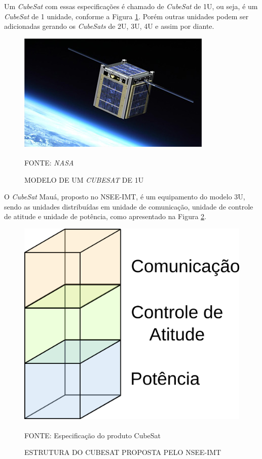 \documentclass[
	12pt,				%
	openright,			%
	oneside,			%
	a4paper,			%
	english,			%
	french,				%
	spanish,			%
	brazil,				%
	oldfontcommands
	]{abntex2}
\begin{document}
	Um \textit{CubeSat} com essas especificações é chamado de \textit{CubeSat} de 1U, ou seja, é um \textit{CubeSat} de 1 unidade, conforme a Figura \ref{Fig_Cubo}. Porém outras unidades podem ser adicionadas gerando os \textit{CubeSats} de 2U, 3U, 4U e assim por diante.
	
	\begin{figure}[th]
		\caption{MODELO DE UM \textit{CUBESAT} DE 1U}
		\label{Fig_Cubo}
		\centering
		\includegraphics[width=0.8\linewidth]{./figs/cubesat_01}
			
		\begin{small}
			FONTE: \textit{NASA}\textsuperscript{\cite{NASA}}
		\end{small}		
	\end{figure}
		
	O \textit{CubeSat} Mauá, proposto no NSEE-IMT, é um equipamento do modelo 3U, sendo as unidades distribuídas em unidade de comunicação, unidade de controle de atitude e unidade de potência, como apresentado na Figura \ref{Fig_Est_Cubo}.
	
	\begin{figure}[th]
		\caption{ESTRUTURA DO CUBESAT PROPOSTA PELO NSEE-IMT}
		\label{Fig_Est_Cubo}
		\centering
		\includegraphics[width=0.4\linewidth]{./figs/cubesat_02}
			
		\begin{small}
			FONTE: Especificação do produto CubeSat\textsuperscript{\cite{Corsi}}
		\end{small}		
	\end{figure}
	\pagebreak
\end{document}
